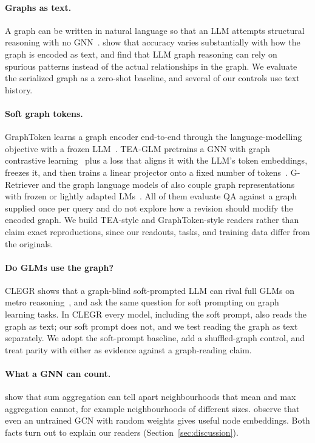 \documentclass[11pt]{article}
\begin{document}
\paragraph{Graphs as text.}
A graph can be written in natural language so that an LLM attempts structural reasoning with no GNN~\cite{wang2023nlgraph,fatemi2024talk}.
\citet{fatemi2024talk} show that accuracy varies substantially with how the graph is encoded as text, and \citet{wang2023nlgraph} find that LLM graph reasoning can rely on spurious patterns instead of the actual relationships in the graph.
We evaluate the serialized graph as a zero-shot baseline, and several of our controls use text history.

\paragraph{Soft graph tokens.}
GraphToken learns a graph encoder end-to-end through the language-modelling objective with a frozen LLM~\cite{perozzi2024graphtoken}.
TEA-GLM pretrains a GNN with graph contrastive learning~\cite{zhu2020grace} plus a loss that aligns it with the LLM's token embeddings, freezes it, and then trains a linear projector onto a fixed number of tokens~\cite{wang2024teaglm}.
G-Retriever and the graph language models of \citet{plenz-frank-2024-graph} also couple graph representations with frozen or lightly adapted LMs~\cite{he2024gretriever}.
All of them evaluate QA against a graph supplied once per query and do not explore how a revision should modify the encoded graph.
We build TEA-style and GraphToken-style readers rather than claim exact reproductions, since our readouts, tasks, and training data differ from the originals.

\paragraph{Do GLMs use the graph?}
CLEGR shows that a graph-blind soft-prompted LLM can rival full GLMs on metro reasoning~\cite{petkar2026clegr}, and \citet{liu2024softpromptgraph} ask the same question for soft prompting on graph learning tasks.
In CLEGR every model, including the soft prompt, also reads the graph as text; our soft prompt does not, and we test reading the graph as text separately.
We adopt the soft-prompt baseline, add a shuffled-graph control, and treat parity with either as evidence against a graph-reading claim.

\paragraph{What a GNN can count.}
\citet{xu2019gin} show that sum aggregation can tell apart neighbourhoods that mean and max aggregation cannot, for example neighbourhoods of different sizes.
\citet{kipf2017gcn} observe that even an untrained GCN with random weights gives useful node embeddings.
Both facts turn out to explain our readers (Section~\ref{sec:discussion}).
\end{document}
